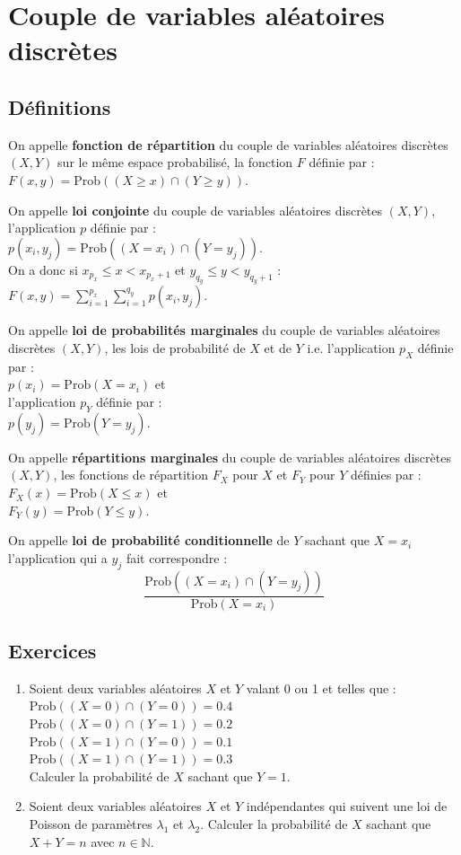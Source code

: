 \documentclass[a4paper,11pt]{book}
\newcommand{\N}{{\mathbb{N}}}
\begin{document}
\section{Couple de variables al\'eatoires discr\`etes}
\subsection{D\'efinitions}
On appelle {\bf fonction de r\'epartition} du couple de variables al\'eatoires 
discr\`etes $(X,Y)$ sur le m\^eme espace probabilis\'e, la fonction $F$ 
d\'efinie par :\\
$F(x,y)=\mbox{Prob}((X\geq x)\cap (Y\geq y))$.

On appelle {\bf loi conjointe} du couple de variables al\'eatoires discr\`etes
$(X,Y)$, l'application $p$ d\'efinie par :\\
$p(x_i,y_j)=\mbox{Prob}((X=x_i)\cap (Y=y_j))$.\\
On a donc si $x_{p_x}\leq x<x_{p_x+1}$ et $y_{q_y}\leq y<y_{q_y+1}$ :\\
$F(x,y)=\sum_{i=1}^{p_x}\sum_{i=1}^{q_y}p(x_i,y_j)$.

On appelle {\bf loi de probabilit\'es marginales} du couple de variables 
al\'eatoires discr\`etes $(X,Y)$, les lois de  probabilit\'e de $X$ et de $Y$ 
i.e. l'application $p_X$ d\'efinie par :\\
$p(x_i)=\mbox{Prob}(X=x_i)$ et\\
l'application $p_Y$ d\'efinie par :\\
$p(y_j)=\mbox{Prob}(Y=y_j)$.

On appelle {\bf  r\'epartitions marginales} du couple de variables al\'eatoires
discr\`etes $(X,Y)$, les fonctions de r\'epartition $F_X$ pour $X$ et $F_Y$ 
pour $Y$  d\'efinies par :\\
$F_X(x)=\mbox{Prob}(X\leq x)$ et\\
$F_Y(y)=\mbox{Prob}(Y\leq y)$.

On appelle {\bf loi de probabilit\'e conditionnelle} de $Y$ sachant que $X=x_i$
l'application qui a $y_j$ fait correspondre :
$$\displaystyle \frac{\mbox{Prob}((X=x_i)\cap (Y=y_j))}{\mbox{Prob}(X=x_i)}$$

\subsection{Exercices}
\begin{enumerate}
\item Soient deux variables al\'eatoires $X$ et $Y$ valant 0 ou 1 et telles que :\\
$\mbox{Prob}((X=0)\cap(Y=0))=0.4$\\
$\mbox{Prob}((X=0)\cap(Y=1))=0.2$\\
$\mbox{Prob}((X=1)\cap(Y=0))=0.1$\\
$\mbox{Prob}((X=1)\cap(Y=1))=0.3$\\
Calculer la probabilit\'e de $X$ sachant que $Y=1$.
\item Soient deux variables al\'eatoires $X$ et $Y$ ind\'ependantes qui suivent
une loi de Poisson de param\`etres $\lambda_1$ et $\lambda_2$. Calculer la 
probabilit\'e de $X$ sachant que $X+Y=n$ avec $n \in \N$.
\end{enumerate}
\end{document}
